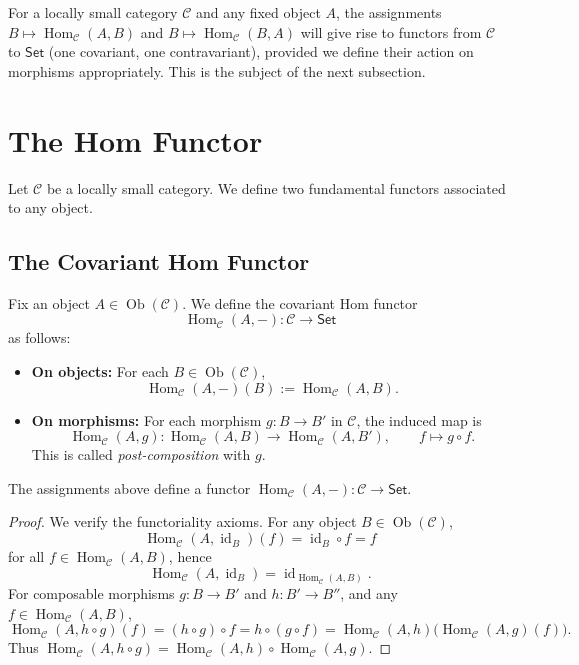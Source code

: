 \begin{remark}
For a locally small category $\mathcal{C}$ and any fixed object $A$, the assignments $B \mapsto \operatorname{Hom}_{\mathcal{C}}(A, B)$ and $B \mapsto \operatorname{Hom}_{\mathcal{C}}(B, A)$ will give rise to functors from $\mathcal{C}$ to $\mathsf{Set}$ (one covariant, one contravariant), provided we define their action on morphisms appropriately. This is the subject of the next subsection.
\end{remark}

\section{The Hom Functor}

Let $\mathcal{C}$ be a locally small category. We define two fundamental functors associated to any object.

\subsection{The Covariant Hom Functor}

Fix an object $A \in \operatorname{Ob}(\mathcal{C})$. We define the covariant Hom functor
\[
\operatorname{Hom}_{\mathcal{C}}(A, -): \mathcal{C} \longrightarrow \mathsf{Set}
\]
as follows:
\begin{itemize}
    \item \textbf{On objects:} For each $B \in \operatorname{Ob}(\mathcal{C})$, 
    \[
    \operatorname{Hom}_{\mathcal{C}}(A, -)(B) := \operatorname{Hom}_{\mathcal{C}}(A, B).
    \]
    \item \textbf{On morphisms:} For each morphism $g: B \to B'$ in $\mathcal{C}$, the induced map is
    \[
    \operatorname{Hom}_{\mathcal{C}}(A, g): \operatorname{Hom}_{\mathcal{C}}(A, B) \longrightarrow \operatorname{Hom}_{\mathcal{C}}(A, B'), \qquad f \longmapsto g \circ f.
    \]
    This is called \emph{post-composition} with $g$.
\end{itemize}

\begin{prop}
The assignments above define a functor $\operatorname{Hom}_{\mathcal{C}}(A, -): \mathcal{C} \to \mathsf{Set}$.
\end{prop}

\begin{proof}
We verify the functoriality axioms. For any object $B \in \operatorname{Ob}(\mathcal{C})$,
\[
\operatorname{Hom}_{\mathcal{C}}(A, \operatorname{id}_B)(f) = \operatorname{id}_B \circ f = f
\]
for all $f \in \operatorname{Hom}_{\mathcal{C}}(A, B)$, hence
\[
\operatorname{Hom}_{\mathcal{C}}(A, \operatorname{id}_B) = \operatorname{id}_{\operatorname{Hom}_{\mathcal{C}}(A, B)}.
\]
For composable morphisms $g: B \to B'$ and $h: B' \to B''$, and any $f \in \operatorname{Hom}_{\mathcal{C}}(A, B)$,
\[
\operatorname{Hom}_{\mathcal{C}}(A, h \circ g)(f) = (h \circ g) \circ f = h \circ (g \circ f) = \operatorname{Hom}_{\mathcal{C}}(A, h)\big(\operatorname{Hom}_{\mathcal{C}}(A, g)(f)\big).
\]
Thus $\operatorname{Hom}_{\mathcal{C}}(A, h \circ g) = \operatorname{Hom}_{\mathcal{C}}(A, h) \circ \operatorname{Hom}_{\mathcal{C}}(A, g)$.
\end{proof}

